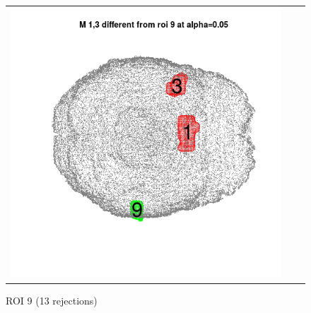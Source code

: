 \documentclass[12pt]{article}
\begin{document}
\begin{figure}[h]
\begin{tabular}{ccc}
\includegraphics[scale = 0.24]{../a7plots/d_3r_9_view3.png} \\ 
\end{tabular}
\caption{ROI 9 (13 rejections)}
\end{figure}
\end{document}
